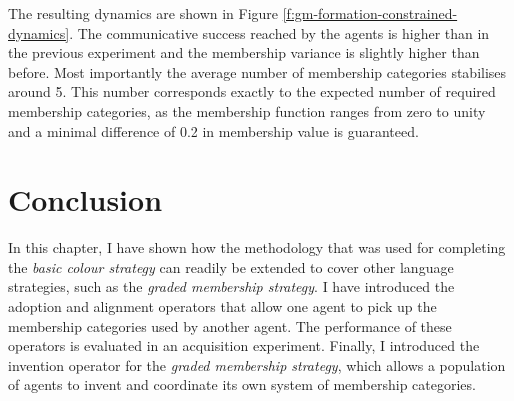 The resulting dynamics are shown in Figure
\ref{f:gm-formation-constrained-dynamics}. The communicative success
reached by the agents is higher than in the previous experiment and
the membership variance is slightly higher than before. Most
importantly the average number of membership categories stabilises
around 5. This number corresponds exactly to the expected number of
required membership categories, as the membership function ranges from
zero to unity and a minimal difference of 0.2 in membership value is
guaranteed.



\section{Conclusion}

In this chapter, I have shown how the methodology that was used for
completing the \emph{basic colour strategy} can readily be extended to cover
other language strategies, such as the \emph{graded membership strategy}. I
have introduced the adoption and alignment operators that allow one
agent to pick up the membership categories used by another agent. The
performance of these operators is evaluated in an acquisition
experiment. Finally, I introduced the invention operator for the \emph{graded
membership strategy}, which allows a population of agents to invent and
coordinate its own system of membership categories.